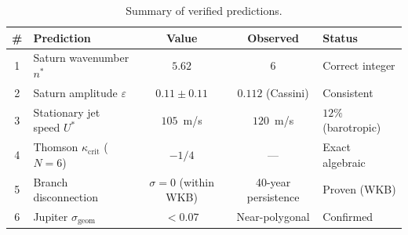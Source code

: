 \begin{table}[htbp]
\centering
\caption{Summary of verified predictions.}
\label{tab:verification}
\begin{tabular}{clccl}
\toprule
\# & Prediction & Value & Observed & Status \\
\midrule
1 & Saturn wavenumber $n^*$ & $5.62$ & $6$ & Correct integer \\
2 & Saturn amplitude $\varepsilon$ & $0.11 \pm 0.11$ & $0.112$ (Cassini) & Consistent \\
3 & Stationary jet speed $U^*$ & $105$~m/s & $120$~m/s & $12\%$ (barotropic) \\
4 & Thomson $\kappa_{\mathrm{crit}}$ ($N=6$) & $-1/4$ & --- & Exact algebraic \\
5 & Branch disconnection & $\sigma = 0$ (within WKB) & 40-year persistence & Proven (WKB) \\
6 & Jupiter $\sigma_{\mathrm{geom}}$ & $< 0.07$ & Near-polygonal & Confirmed \\
\bottomrule
\end{tabular}
\end{table}
